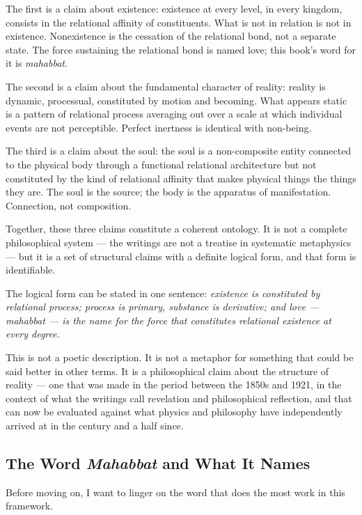 The first is a claim about existence: existence at every level, in every
kingdom, consists in the relational affinity of constituents.
What is not in relation is not in existence.
Nonexistence is the cessation of the relational bond, not a separate state.
The force sustaining the relational bond is named love; this book's word for
it is \textit{mahabbat}.

The second is a claim about the fundamental character of reality:
reality is dynamic, processual, constituted by motion and becoming.
What appears static is a pattern of relational process averaging out over
a scale at which individual events are not perceptible.
Perfect inertness is identical with non-being.

The third is a claim about the soul: the soul is a non-composite entity
connected to the physical body through a functional relational architecture
but not constituted by the kind of relational affinity that makes physical
things the things they are.
The soul is the source; the body is the apparatus of manifestation.
Connection, not composition.

Together, these three claims constitute a coherent ontology.
It is not a complete philosophical system --- the writings are not a
treatise in systematic metaphysics --- but it is a set of structural claims
with a definite logical form, and that form is identifiable.

The logical form can be stated in one sentence: \emph{existence is
constituted by relational process; process is primary, substance is derivative;
and love --- \textit{mahabbat} --- is the name for the force that constitutes
relational existence at every degree.}

This is not a poetic description.
It is not a metaphor for something that could be said better in other terms.
It is a philosophical claim about the structure of reality --- one that was
made in the period between the 1850s and 1921, in the context of what the
\bahai writings call revelation and philosophical reflection, and that can
now be evaluated against what physics and philosophy have independently arrived
at in the century and a half since.

\subsection{The Word \textit{Mahabbat} and What It Names}

Before moving on, I want to linger on the word that does the most work
in this framework.


